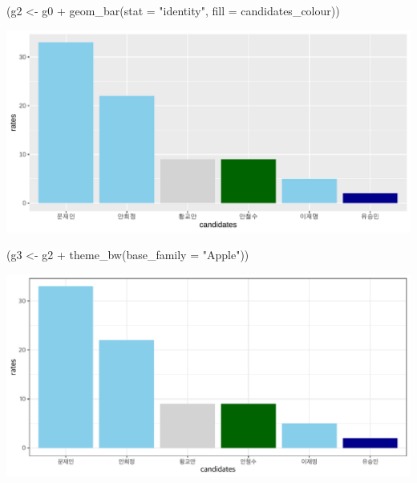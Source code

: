 \documentclass[
]{article}
\newenvironment{Shaded}{}{}
\newcommand{\AttributeTok}[1]{\textcolor[rgb]{0.49,0.56,0.16}{#1}}
\newcommand{\FunctionTok}[1]{\textcolor[rgb]{0.02,0.16,0.49}{#1}}
\newcommand{\NormalTok}[1]{#1}
\newcommand{\OtherTok}[1]{\textcolor[rgb]{0.00,0.44,0.13}{#1}}
\newcommand{\SpecialCharTok}[1]{\textcolor[rgb]{0.25,0.44,0.63}{#1}}
\newcommand{\StringTok}[1]{\textcolor[rgb]{0.25,0.44,0.63}{#1}}
\begin{document}
\begin{Shaded}
\begin{Highlighting}[]
\NormalTok{(g2 }\OtherTok{\textless{}{-}}\NormalTok{ g0 }\SpecialCharTok{+}
  \FunctionTok{geom\_bar}\NormalTok{(}\AttributeTok{stat =} \StringTok{"identity"}\NormalTok{, }
           \AttributeTok{fill =}\NormalTok{ candidates\_colour))}
\end{Highlighting}
\end{Shaded}

\includegraphics{poll_JTBC_1702_pdf_files/figure-latex/unnamed-chunk-4-1.pdf}

\begin{Shaded}
\begin{Highlighting}[]
\NormalTok{(g3 }\OtherTok{\textless{}{-}}\NormalTok{ g2 }\SpecialCharTok{+}
    \FunctionTok{theme\_bw}\NormalTok{(}\AttributeTok{base\_family =} \StringTok{"Apple"}\NormalTok{))}
\end{Highlighting}
\end{Shaded}

\includegraphics{poll_JTBC_1702_pdf_files/figure-latex/unnamed-chunk-4-2.pdf}
\end{document}
